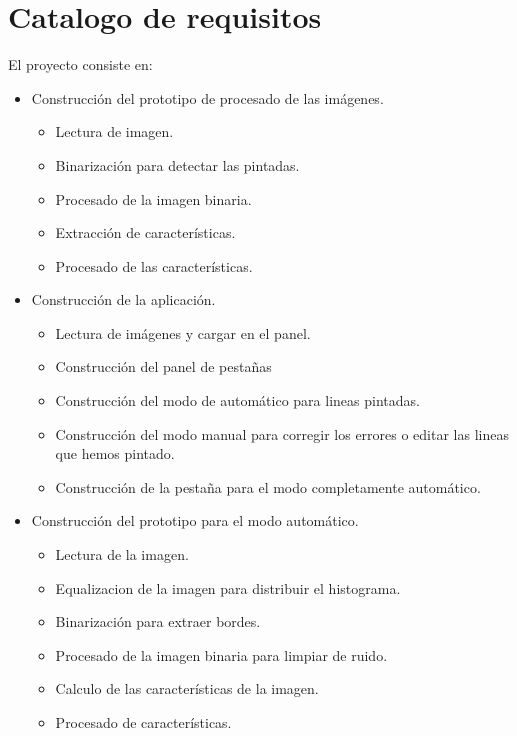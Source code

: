 \section{Catalogo de requisitos}
El proyecto consiste en:
\begin{itemize}
	\item Construcción del prototipo de procesado de las imágenes.
		\begin{itemize}
			\item Lectura de imagen.
			\item Binarización para detectar las pintadas.
			\item Procesado de la imagen binaria.
			\item Extracción de características.
			\item Procesado de las características.
		\end{itemize}
	\item Construcción de la aplicación.
		\begin{itemize}
			\item Lectura de imágenes y cargar en el panel.
			\item Construcción del panel de pestañas
			\item Construcción del modo de automático para lineas pintadas.
			\item Construcción del modo manual para corregir los errores o editar las lineas que hemos pintado.
			\item Construcción de la pestaña para el modo completamente automático.			
		\end{itemize}
	\item Construcción del prototipo para el modo automático.
		\begin{itemize}
			\item Lectura de la imagen.
			\item Equalizacion de la imagen para distribuir el histograma.
			\item Binarización para extraer bordes.
			\item Procesado de la imagen binaria para limpiar de ruido.
			\item Calculo de las características de la imagen.
			\item Procesado de características.		
		\end{itemize}
\end{itemize}


